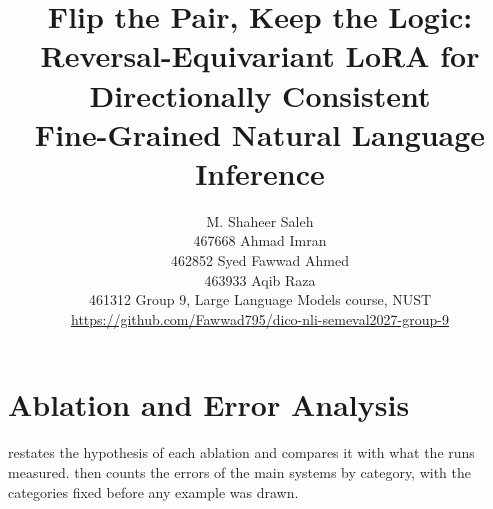 \documentclass[11pt]{article}
\title{Flip the Pair, Keep the Logic:\\
Reversal-Equivariant LoRA for Directionally Consistent\\
Fine-Grained Natural Language Inference}
\author{
  M. Shaheer Saleh \\ 467668 \And
  Ahmad Imran \\ 462852 \And
  Syed Fawwad Ahmed \\ 463933 \And
  Aqib Raza \\ 461312 \AND
  Group 9, Large Language Models course, NUST \\
  \url{https://github.com/Fawwad795/dico-nli-semeval2027-group-9}
}
\begin{document}
\maketitle










\section{Ablation and Error Analysis}
\label{sec:analysis}
 restates the hypothesis of each ablation and compares it with what the runs
measured.  then counts the errors of the main systems by category, with the
categories fixed before any example was drawn.











\end{document}
